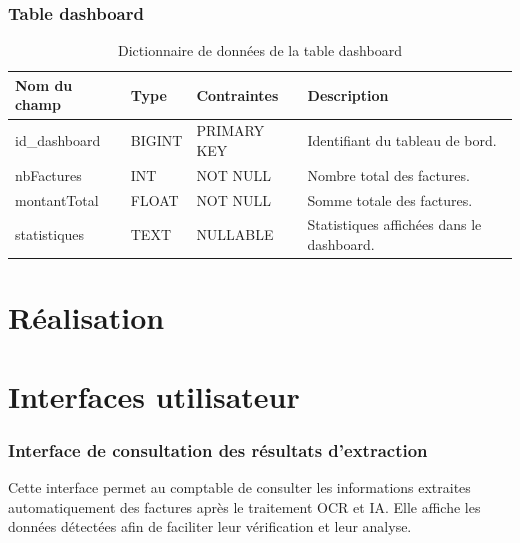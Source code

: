 \subsubsection{Table dashboard}

\begin{table}[H]
	\centering
	\footnotesize
	
	\begin{tabularx}{\textwidth}{|p{3cm}|p{2.5cm}|p{3.5cm}|X|}
		\hline
		
		\rowcolor{blue!20}
		\textbf{Nom du champ}
		&
		\textbf{Type}
		&
		\textbf{Contraintes}
		&
		\textbf{Description}
		\\ \hline
		
		id\_dashboard
		&
		BIGINT
		&
		PRIMARY KEY
		&
		Identifiant du tableau de bord.
		\\ \hline
		
		nbFactures
		&
		INT
		&
		NOT NULL
		&
		Nombre total des factures.
		\\ \hline
		
		montantTotal
		&
		FLOAT
		&
		NOT NULL
		&
		Somme totale des factures.
		\\ \hline
		
		statistiques
		&
		TEXT
		&
		NULLABLE
		&
		Statistiques affichées dans le dashboard.
		\\ \hline
		
	\end{tabularx}
	
	\caption{Dictionnaire de données de la table dashboard}
	\label{tab:dashboard_table}
	
\end{table}
\section{Réalisation}

\section{Interfaces utilisateur}

\subsubsection{Interface de consultation des résultats d’extraction}

Cette interface permet au comptable de consulter les informations extraites automatiquement des factures après le traitement OCR et IA. Elle affiche les données détectées afin de faciliter leur vérification et leur analyse.

